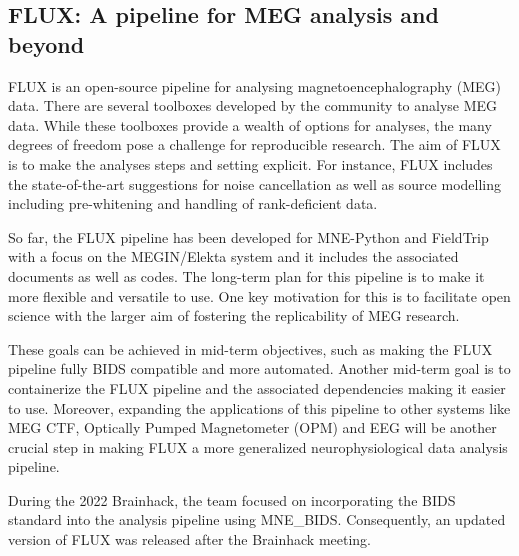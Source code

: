 \documentclass[../main.tex]{subfiles}
\begin{document}
\subsection{FLUX: A pipeline for MEG analysis and beyond}\label{sec:FLUX}


FLUX\cite{Ferrante2022} is an open-source pipeline for analysing magnetoencephalography (MEG) data. There are several toolboxes developed by the community to analyse MEG data. While these toolboxes provide a wealth of options for analyses, the many degrees of freedom pose a challenge for reproducible research. The aim of FLUX is to make the analyses steps and setting explicit. For instance, FLUX includes the state-of-the-art suggestions for noise cancellation as well as source modelling including pre-whitening and handling of rank-deficient data.

So far, the FLUX pipeline has been developed for MNE-Python\cite{Gramfort2014} and FieldTrip\cite{Oostenveld2011} with a focus on the MEGIN/Elekta system and it includes the associated documents as well as codes.
The long-term plan for this pipeline is to make it more flexible and versatile to use. One key motivation for this is to facilitate open science with the larger aim of fostering the replicability of MEG research.

These goals can be achieved in mid-term objectives, such as making the FLUX pipeline fully BIDS compatible and more automated. Another mid-term goal is to containerize the FLUX pipeline and the associated dependencies making it easier to use. Moreover, expanding the applications of this pipeline to other systems like MEG CTF, Optically Pumped Magnetometer (OPM) and EEG will be another crucial step in making FLUX a more generalized neurophysiological data analysis pipeline.

During the 2022 Brainhack, the team focused on incorporating the BIDS standard into the analysis pipeline using MNE_BIDS\cite{Appelhoff2019}. Consequently, an updated version of FLUX was released after the Brainhack meeting.
\end{document}
